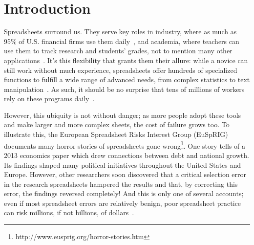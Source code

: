 \documentclass[conference]{IEEEtran}
\newcommand{\toolnameend}{Perquimans}
\newcommand{\toolnameposs}{Perquimans' }
\begin{document}
	\begin{abstract} 
		Spreadsheet environments often come equipped with an abundance of functions
		and operations to manipulate data, which users can combine into a complex
		formulae for more sophisticated programs. However, anticipating these
		combinations is difficult, complicating matters for both researchers and
		practitioners who want to study formulae to improve spreadsheet practices.
		Therefore, we developed \toolnameend, a tool that analyzes spreadsheet corpora
		to visualize patterns of function combination as an interactive tree, capable
		of representing both the most common and most anomalous patterns of formula
		construction and their contexts in actual workbooks. Using spreadsheets from
		the Enron corpus, we conduct both a case study and a user study to explore
		\toolnameposs various applications, particularly those in flexible smell
		detection and spreadsheet education.
		
	\end{abstract}
	
	\section{Introduction} Spreadsheets surround us. They serve key roles in
	industry, where as much as 95\% of U.S. financial firms use them daily~\cite{panko2008sarbanes}, and academia, where teachers can use them to track
	research and students' grades, not to mention many other applications~\cite{ko2011state}. It's this flexibility that grants them their allure: while
	a novice can still work without much experience, spreadsheets offer hundreds of
	specialized functions to fulfill a wide range of advanced needs, from complex
	statistics to text manipulation~\cite{nardi1990spreadsheet}. As such, it should
	be no surprise that tens of millions of workers rely on these programs daily~\cite{scaffidi2005estimating}.
	
	However, this ubiquity is not without danger; as more people adopt these tools
	and make larger and more complex sheets, the cost of failure grows too. To illustrate this, the European Spreadsheet Risks Interest Group (EuSpRIG) documents
	many horror stories of spreadsheets gone 
	wrong\footnote{http://www.eusprig.org/horror-stories.htm}. One story tells
	of a 2013 economics paper which drew connections between debt and
	national growth. Its findings shaped many political initiatives throughout the
	United States and Europe. However, other researchers soon discovered that a
	critical selection error in the research spreadsheets hampered the results and
	that, by correcting this error, the findings reversed completely! And this
	is only one of several accounts; even if most spreadsheet errors are relatively
	benign, poor spreadsheet practice can risk millions, if not billions, of
	dollars~\cite{powell2009impact}.
	
\end{document}
